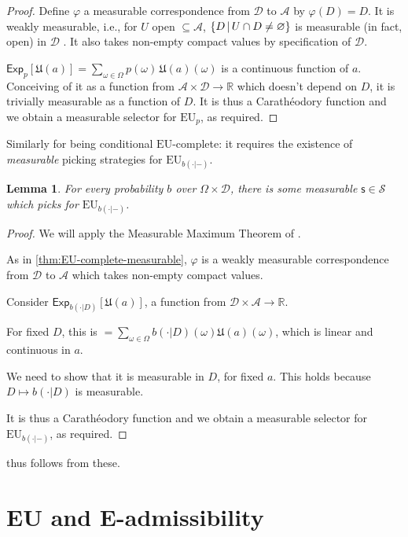 \documentclass[a4paper]{article}
\newtheorem{lemma}[theorem]{Lemma}
\newcommand\A{\mathcal{A}}
\newcommand\Exp{\mathsf{Exp}}
\newcommand\EU{\mathrm{EU}}
\newcommand\U{\mathfrak{U}} %
\newcommand{\Decs}{\mathcal{D}}
\renewcommand\S{\mathcal{S}}
\newcommand\s{\mathsf{s}}
\renewcommand{\Re}{\mathbb{R}}
\renewcommand{\color}[1]{}
\newenvironment{colored}[1]{\leavevmode\color{#1}}{}
\newcommand\SetDelimiter[1][]{
	\nonscript\,#1\vert \allowbreak \nonscript\,\mathopen{}}
\providecommand\given{\SetDelimiter}
\renewcommand{\emptyset}{\varnothing}
\newenvironment{CCM rewritten}
{\begingroup\color{blue}} %
{\endgroup}              %
\begin{document}
\begin{colored}{violet}
\begin{proof}
	Define $\varphi$ a measurable correspondence from $\Decs$ to $\A$ by $\varphi(D)=D$. It is weakly measurable, i.e., for $U$ open $\subseteq\A$, $\{D\given U\cap D\neq\emptyset\}$ is measurable (in fact, open) in $\Decs$ \citep[3.91]{aliprantis2006infinite}. It also takes non-empty compact values by specification of $\Decs$. 
	
	$\Exp_p[\U(a)]=\sum_{\omega\in\Omega}p(\omega)\,\U(a)(\omega)$ is a continuous function of $a$. Conceiving of it as a function from $\A\times\Decs\to\Re$ which doesn't depend on $D$, it is trivially measurable as a function of $D$. 
	It is thus a Carathéodory function and we obtain a measurable selector for $\EU_p$, as required. 
\end{proof}

Similarly for being conditional $\EU$-complete: it requires the existence of \emph{measurable} picking strategies for $\EU_{b(\cdot|-)}$. 

\begin{lemma}\label{thm:EU-complete-measurable[dep]}
	For every probability $b$ over $\Omega\times\Decs$, there is some measurable $\s\in\S$ which picks for $\EU_{b(\cdot|-)}$. 
\end{lemma}

\begin{proof}
	We will apply the Measurable Maximum Theorem of \citet[Theorem 18.19]{aliprantis2006infinite}. 

As in \cref{thm:EU-complete-measurable}, $\varphi$ is a weakly measurable correspondence from $\Decs$ to $\A$ which takes non-empty compact values. 
	
	Consider $\Exp_{b(\cdot|D)}[\U(a)]$, a function from $\Decs\times\A\to\Re$. 
	
	For fixed $D$, this is $=\sum_{\omega\in\Omega}b(\cdot|D)(\omega)\U(a)(\omega)$, which is linear and continuous in $a$. 
	
	We need to show that it is measurable in $D$, for fixed $a$. This holds because $D\mapsto b(\cdot|D)$ is measurable. 
	
	It is thus a Carathéodory function and we obtain a measurable selector for $\EU_{b(\cdot|-)}$, as required. 
\end{proof}

 thus follows from these. 

\end{colored}
\section{EU and E-admissibility}
\end{document}

